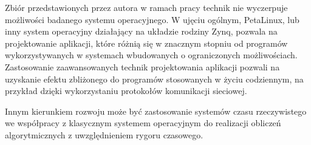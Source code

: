 Zbiór przedstawionych przez autora w ramach pracy technik nie wyczerpuje możliwości badanego systemu operacyjnego. W ujęciu ogólnym, PetaLinux, lub inny system operacyjny działający na układzie rodziny Zynq, pozwala na projektowanie aplikacji, które różnią się w znacznym stopniu od programów wykorzystywanych w systemach wbudowanych o ograniczonych możliwościach. Zastosowanie zaawansowanych technik projektowania aplikacji pozwali na uzyskanie efektu zbliżonego do programów stosowanych w życiu codziennym, na przykład dzięki wykorzystaniu protokołów komunikacji sieciowej.

Innym kierunkiem rozwoju może być zastosowanie systemów czasu rzeczywistego we współpracy z klasycznym systemem operacyjnym do realizacji obliczeń algorytmicznych z uwzględnieniem rygoru czasowego.